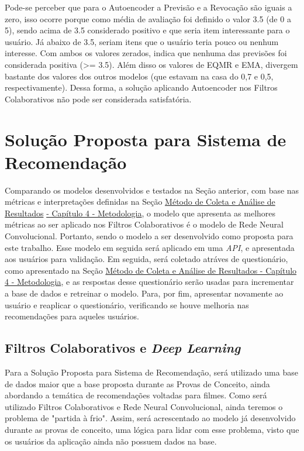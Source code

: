 Pode-se perceber que para o Autoencoder a Previsão e a Revocação são iguais a zero, isso ocorre porque como média
de avaliação foi definido o valor 3.5 (de 0 a 5), sendo acima de 3.5 considerado positivo e que seria item interessante
para o usuário. Já abaixo de 3.5, seriam itens que o usuário teria pouco ou nenhum interesse. Com ambos os valores zerados,
indica que nenhuma das previsões foi considerada positiva (>= 3.5). Além disso os valores de EQMR e EMA, divergem
bastante dos valores dos outros modelos (que estavam na casa do 0,7 e 0,5, respectivamente). Dessa forma, a solução
aplicando Autoencoder nos Filtros Colaborativos não pode ser considerada satisfatória.

\section{Solução Proposta para Sistema de Recomendação}\label{sec:solucao}

Comparando os modelos desenvolvidos e testados na Seção anterior, com base nas métricas e interpretações definidas
na Seção \hyperref[sec:meteanresul]{Método de Coleta e Análise de Resultados} \hyperref[sec:meteanresul]{ - Capítulo 4 - Metodologia}, o modelo que
apresenta as melhores métricas ao ser aplicado nos Filtros Colaborativos é o modelo de Rede Neural Convolucional. Portanto,
sendo o modelo a ser desenvolvido como proposta para este trabalho. Esse modelo em seguida será aplicado em uma \textit{API}, 
e apresentada aos usuários para validação. Em seguida, será coletado atráves de questionário, como apresentado na Seção
\hyperref[sec:meteanresul]{Método de Coleta e Análise de } \hyperref[sec:meteanresul]{ Resultados - Capítulo 4 - Metodologia}, e as respostas desse questionário
serão usadas para incrementar a base de dados e retreinar o modelo. Para, por fim, apresentar novamente ao usuário e reaplicar
o questionário, verificando se houve melhoria nas recomendações para aqueles usuários. 

\subsection{Filtros Colaborativos e \textit{Deep Learning}}\label{subsec:modelos}
Para a Solução Proposta para Sistema de Recomendação, será utilizado uma base de dados maior que a base
proposta durante as Provas de Conceito, ainda abordando a temática de recomendações voltadas para filmes. Como será utilizado
Filtros Colaborativos e Rede Neural Convolucional, ainda teremos o problema de "partida à frio". Assim, será acrescentado ao
modelo já desenvolvido durante as provas de conceito, uma lógica para lidar com esse problema, visto que os usuários da aplicação
ainda não possuem dados na base.

